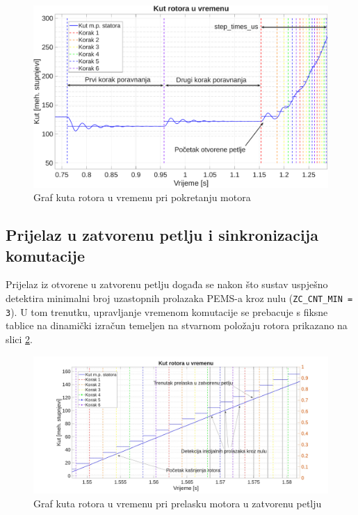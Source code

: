 \documentclass[diplomskirad, upload]{fer}
\begin{document}
\begin{figure}[h!]
	\centering
	\includegraphics[width=\textwidth]{csv/pokretanje.pdf}
	\caption{Graf kuta rotora u vremenu pri pokretanju motora}
	\label{fig:pokretanje}
\end{figure}

\subsection{Prijelaz u zatvorenu petlju i sinkronizacija komutacije}
\label{ssec:prijelaz_u_zatvorenu_petlju}

Prijelaz iz otvorene u zatvorenu petlju događa se nakon što sustav uspješno
detektira minimalni broj uzastopnih prolazaka PEMS-a kroz nulu
(\texttt{ZC\_CNT\_MIN = 3}). U tom trenutku, upravljanje vremenom komutacije se
prebacuje s fiksne tablice na dinamički izračun temeljen na stvarnom položaju
rotora prikazano na slici \ref{fig:closed_loop}.

\begin{figure}[h!]
	\centering
	\includegraphics[width=\textwidth]{csv/closed_loop.pdf}
	\caption{Graf kuta rotora u vremenu pri prelasku motora u zatvorenu petlju}
	\label{fig:closed_loop}
\end{figure}
\end{document}
